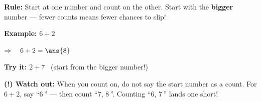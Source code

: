 \documentclass[12pt]{article}
\begin{document}

\begin{formulabox}
\textbf{Rule:} Start at one number and count on the other. Start with the
\textbf{bigger} number --- fewer counts means fewer chances to slip!
\end{formulabox}

\begin{examplebox}
\textbf{Example:} \quad $6 + 2$

$\Rightarrow\quad 6 + 2 = \ans{8}$
\end{examplebox}

\begin{tryitbox}
\textbf{Try it:} \quad $2 + 7$ \ (start from the bigger number!)\\[2pt]
\end{tryitbox}

\begin{watchoutbox}
\textbf{(!) Watch out:} When you count on, do not say the start number as a
count. For $6+2$, say ``6\,'' --- then count ``7, 8\,''. Counting ``6, 7\,''
lands one short!
\end{watchoutbox}
\end{document}
